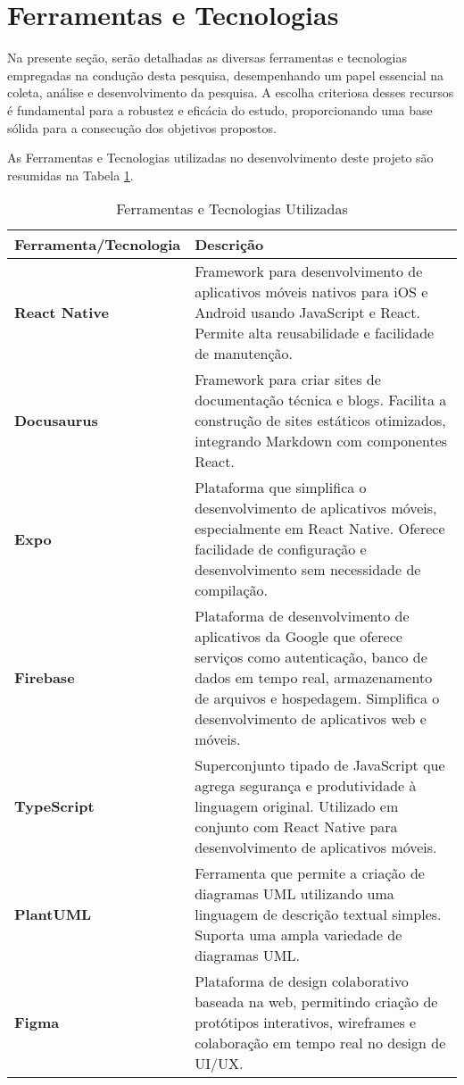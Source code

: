 \section{Ferramentas e Tecnologias}

Na presente seção, serão detalhadas as diversas ferramentas e tecnologias empregadas na condução desta pesquisa, desempenhando um papel essencial na coleta, análise e desenvolvimento da pesquisa. A escolha criteriosa desses recursos é fundamental para a robustez e eficácia do estudo, proporcionando uma base sólida para a consecução dos objetivos propostos.

As Ferramentas e Tecnologias utilizadas no desenvolvimento deste projeto são resumidas na Tabela \ref{tab:ferramentas_tecnologias}.

\begin{table}[H]
    \centering
    \caption{Ferramentas e Tecnologias Utilizadas}
    \label{tab:ferramentas_tecnologias}
    \begin{tabular}{|l|p{10cm}|}
        \hline
        \textbf{Ferramenta/Tecnologia} & \textbf{Descrição} \\
        \hline
        \textbf{React Native} & Framework para desenvolvimento de aplicativos móveis nativos para iOS e Android usando JavaScript e React. Permite alta reusabilidade e facilidade de manutenção. \\
        \hline
        \textbf{Docusaurus} & Framework para criar sites de documentação técnica e blogs. Facilita a construção de sites estáticos otimizados, integrando Markdown com componentes React. \\
        \hline
        \textbf{Expo} & Plataforma que simplifica o desenvolvimento de aplicativos móveis, especialmente em React Native. Oferece facilidade de configuração e desenvolvimento sem necessidade de compilação. \\
        \hline
        \textbf{Firebase} & Plataforma de desenvolvimento de aplicativos da Google que oferece serviços como autenticação, banco de dados em tempo real, armazenamento de arquivos e hospedagem. Simplifica o desenvolvimento de aplicativos web e móveis. \\
        \hline
        \textbf{TypeScript} & Superconjunto tipado de JavaScript que agrega segurança e produtividade à linguagem original. Utilizado em conjunto com React Native para desenvolvimento de aplicativos móveis. \\
        \hline
        \textbf{PlantUML} & Ferramenta que permite a criação de diagramas UML utilizando uma linguagem de descrição textual simples. Suporta uma ampla variedade de diagramas UML. \\
        \hline
        \textbf{Figma} & Plataforma de design colaborativo baseada na web, permitindo criação de protótipos interativos, wireframes e colaboração em tempo real no design de UI/UX. \\
        \hline
    \end{tabular}
\end{table}



